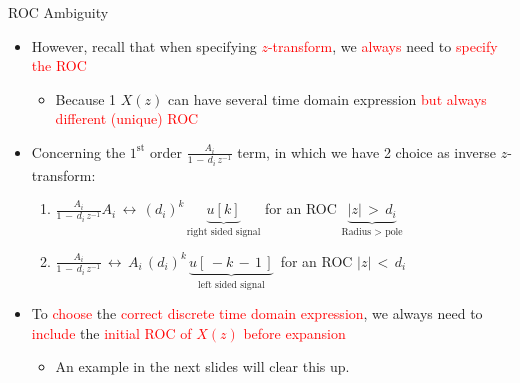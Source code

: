 \documentclass{beamer}
\begin{document}
\begin{frame}[t]{ROC Ambiguity}

\begin{itemize}

\item However, recall that when specifying \textcolor{red}{$z$-transform}, we \textcolor{red}{always} need to \textcolor{red}{specify the ROC}

	\begin{itemize}
	\item Because 1 $X(z)$ can have several time domain expression \textcolor{red}{but always different (unique) ROC}	
	\end{itemize}

\item Concerning the $1^{\mathrm{st}}$ order $\frac{A_i}{1 \, - \, d_i \, z^{-1}}$ term, in which we have 2 choice as inverse $z$-transform:

	\begin{enumerate}
	\item $ \displaystyle\frac{A_i}{1 \, - \, d_i \, z^{-1}} A_i \, \leftrightarrow \, (d_i)^k \, \underbrace{u[k] }_{\text{right sided signal}} $ for an ROC $\underbrace{|z| \, > \, d_i}_{\text{Radius $>$ pole}}$
	
	\item  $ \displaystyle\frac{A_i}{1 \, - \, d_i \, z^{-1}} \, \leftrightarrow \, A_i \, (d_i)^k \, \underbrace{ u[\, -k \, - \, 1 \,] }_{\text{left sided signal}}\, $ for an ROC $|z| \, < \, d_i$
	\end{enumerate}

\item To \textcolor{red}{choose} the \textcolor{red}{correct discrete time domain expression}, we always need to \textcolor{red}{include} the \textcolor{red}{initial ROC of $X(z)$ before expansion}

	\begin{itemize}
	\item An example in the next slides will clear this up.
	\end{itemize}
\end{itemize}

\end{frame}
\end{document}
